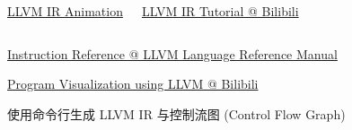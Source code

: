 \begin{frame}{}
	\begin{columns}
		  \begin{center}
				\href{https://blog.piovezan.ca/compilers/llvm\_ir\_animation/llvm\_ir.html}{LLVM IR Animation}
			\end{center}
		  \begin{center}
				\href{https://www.bilibili.com/video/BV1mE421g7BA/?share\_source=copy\_web\&vd\_source=afddc1f6e07c3046ed07519aa34370fd}{LLVM IR Tutorial @ Bilibili}
			\end{center}
	\end{columns}
\end{frame}

\begin{frame}{}
	\begin{center}
		\href{https://llvm.org/docs/LangRef.html\#instruction-reference}{Instruction Reference @ LLVM Language Reference Manual}
	\end{center}
\end{frame}

\begin{frame}{}
	\begin{center}
		\href{https://www.bilibili.com/video/BV1jT421C7cH/?share\_source=copy\_web\&vd\_source=afddc1f6e07c3046ed07519aa34370fd}{Program Visualization using LLVM @ Bilibili}

		\vspace{0.30cm}
		\vspace{0.30cm}

		使用命令行生成 LLVM IR 与控制流图 (Control Flow Graph)
	\end{center}
\end{frame}
